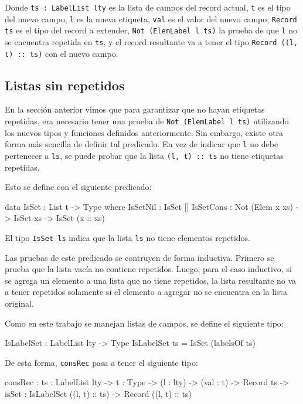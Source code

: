 Donde \texttt{ts : LabelList lty} es la lista de campos del record actual, \texttt{t} es el tipo del nuevo campo, \texttt{l} es la nueva etiqueta, \texttt{val} es el valor del nuevo campo, \texttt{Record ts} es el tipo del record a extender, \texttt{Not (ElemLabel l ts)} la prueba de que \texttt{l} no se encuentra repetida en \texttt{ts}, y el record resultante va a tener el tipo \texttt{Record ((l, t) :: ts)} con el nuevo campo.

\subsection{Listas sin repetidos}

En la sección anterior vimos que para garantizar que no hayan etiquetas repetidas, era necesario tener una prueba de \texttt{Not (ElemLabel l ts)} utilizando los nuevos tipos y funciones definidos anteriormente. Sin embargo, existe otra forma más sencilla de definir tal predicado. En vez de indicar que \texttt{l} no debe pertenecer a \texttt{ls}, se puede probar que la lista \texttt{(l, t) :: ts} no tiene etiquetas repetidas.

Esto se define con el siguiente predicado:

\begin{code}
data IsSet : List t -> Type where
  IsSetNil : IsSet []
  IsSetCons : Not (Elem x xs) -> IsSet xs ->
    IsSet (x :: xs)
\end{code}

El tipo \texttt{IsSet ls} indica que la lista \texttt{ls} no tiene elementos repetidos.

Las pruebas de este predicado se contruyen de forma inductiva. Primero se prueba que la lista vacía no contiene repetidos. Luego, para el caso inductivo, si se agrega un elemento a una lista que no tiene repetidos, la lista resultante no va a tener repetidos solamente si el elemento a agregar no se encuentra en la lista original.

Como en este trabajo se manejan listas de campos, se define el siguiente tipo:

\begin{code}
IsLabelSet : LabelList lty -> Type
IsLabelSet ts = IsSet (labelsOf ts)
\end{code}

De esta forma, \texttt{consRec} pasa a tener el siguiente tipo:

\begin{code}
consRec : {ts : LabelList lty} ->
  {t : Type} -> (l : lty) -> (val : t) ->
  Record ts -> {isSet : IsLabelSet ((l, t) :: ts)} ->
  Record ((l, t) :: ts)
\end{code}

